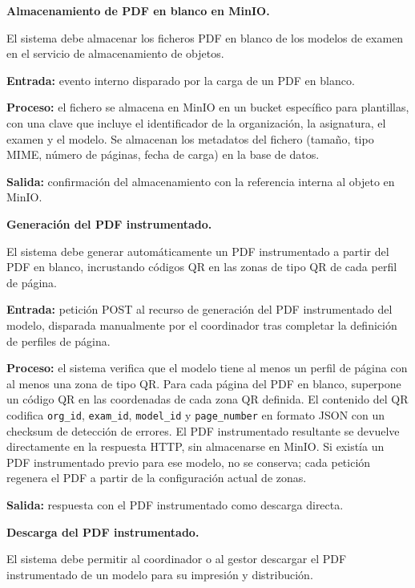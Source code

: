 \begin{functional}
\begin{functional}
    \item \textbf{Almacenamiento de PDF en blanco en MinIO.}

    El sistema debe almacenar los ficheros PDF en blanco de los modelos de examen en el servicio de almacenamiento de objetos.

    \textbf{Entrada:} evento interno disparado por la carga de un PDF en blanco.

    \textbf{Proceso:} el fichero se almacena en MinIO en un bucket específico para plantillas, con una clave que incluye el identificador de la organización, la asignatura, el examen y el modelo. Se almacenan los metadatos del fichero (tamaño, tipo MIME, número de páginas, fecha de carga) en la base de datos.

    \textbf{Salida:} confirmación del almacenamiento con la referencia interna al objeto en MinIO.

    \item \textbf{Generación del PDF instrumentado.}

    El sistema debe generar automáticamente un PDF instrumentado a partir del PDF en blanco, incrustando códigos QR en las zonas de tipo QR de cada perfil de página.

    \textbf{Entrada:} petición POST al recurso de generación del PDF instrumentado del modelo, disparada manualmente por el coordinador tras completar la definición de perfiles de página.

    \textbf{Proceso:} el sistema verifica que el modelo tiene al menos un perfil de página con al menos una zona de tipo QR. Para cada página del PDF en blanco, superpone un código QR en las coordenadas de cada zona QR definida. El contenido del QR codifica \texttt{org\_id}, \texttt{exam\_id}, \texttt{model\_id} y \texttt{page\_number} en formato JSON con un checksum de detección de errores. El PDF instrumentado resultante se devuelve directamente en la respuesta HTTP, sin almacenarse en MinIO. Si existía un PDF instrumentado previo para ese modelo, no se conserva; cada petición regenera el PDF a partir de la configuración actual de zonas.

    \textbf{Salida:} respuesta con el PDF instrumentado como descarga directa.

    \item \textbf{Descarga del PDF instrumentado.}

    El sistema debe permitir al coordinador o al gestor descargar el PDF instrumentado de un modelo para su impresión y distribución.


\end{functional}
\end{functional}
